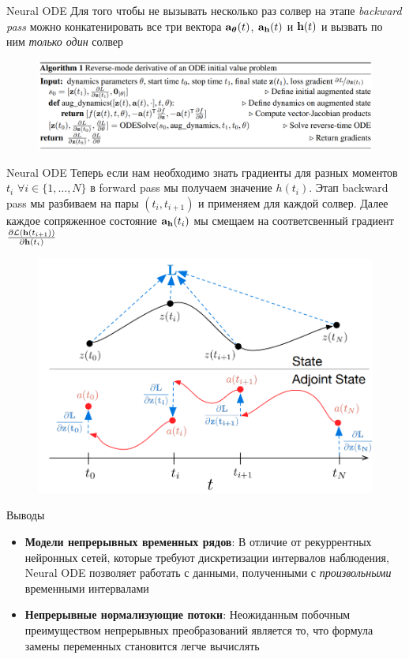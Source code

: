 \begin{frame}{Neural ODE}
    Для того чтобы не вызывать несколько раз солвер на этапе \textit{backward pass} можно конкатенировать все три вектора $\mathbf{a}_{\boldsymbol{\theta}}(t)$, $\mathbf{a}_{\mathbf{h}}(t)$ и $\mathbf{h}(t)$ и вызвать по ним \textit{только один} солвер
    \begin{figure}
            \centering
            \includegraphics[width=0.85\linewidth]{figures/alg.png}
            \label{fig:alg}
        \end{figure}
\end{frame}

\begin{frame}{Neural ODE}
    Теперь если нам необходимо знать градиенты для разных моментов $t_i$ $\forall i\in\{1,\dots, N\}$ в forward pass мы получаем значение $h(t_i)$. Этап backward pass мы разбиваем на пары $(t_i, t_{i+1})$ и применяем для каждой солвер. Далее каждое сопряженное состояние $\mathbf{a}_{\mathbf{h}}(t_i)$ мы смещаем на соответсвенный градиент $\frac{\partial \mathcal{L}(\mathbf{h}(t_{i+1}))}{\partial \mathbf{h}(t_i)}$
    \begin{figure}
        \centering
        \includegraphics[width=0.6\linewidth]{figures/reverse.png}
        \label{fig:rev}
    \end{figure}
\end{frame}

\begin{frame}{Выводы}
    \begin{itemize}
        \item \textbf{Модели непрерывных временных рядов}: В отличие от рекуррентных нейронных сетей, которые требуют дискретизации интервалов наблюдения, Neural ODE позволяет работать с данными, полученными с \textit{произвольными} временными интервалами
        \item \textbf{Непрерывные нормализующие потоки}: Неожиданным побочным преимуществом непрерывных преобразований является то, что формула замены переменных становится легче вычислять
    \end{itemize}

\end{frame}


